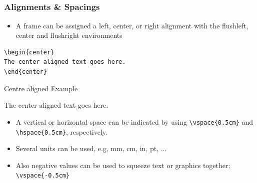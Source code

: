\documentclass[[newPxFont]{beamer}
\begin{document}
\subsection{}
\begin{frame}[fragile]
  \frametitle{Alignments \& Spacings}
\begin{itemize}
  \item A frame can be assigned a left, center, or right alignment with the
flushleft, center and flushright environments
\end{itemize}
\begin{verbatim}
\begin{center}
The center aligned text goes here.
\end{center}
\end{verbatim}
\begin{block}{Centre aligned Example}
\begin{center}
The center aligned text goes here.
\end{center}
\end{block}
\begin{itemize}
  \item A vertical or horizontal space can be indicated by using \verb+\vspace{0.5cm}+ and \verb+\hspace{0.5cm}+, respectively.
\item Several units can be used, e.g, mm, cm, in, pt, ...
\item Also negative values can be used to squeeze text or graphics together: \verb+\vspace{-0.5cm}+
\end{itemize}
\end{frame}
\end{document}
